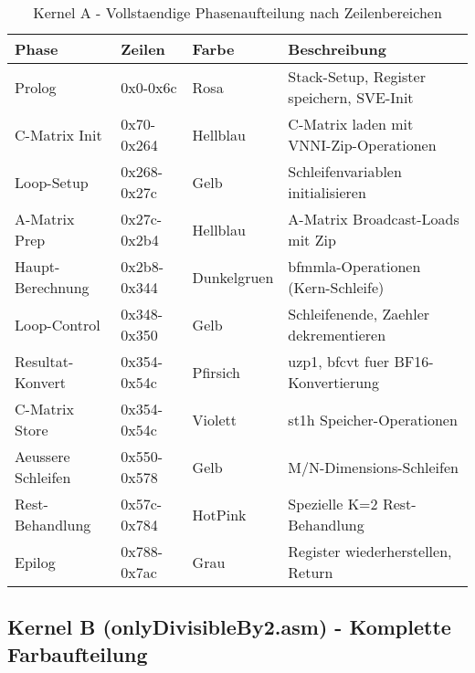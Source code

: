 \documentclass[11pt,a4paper]{article}
\begin{document}
\begin{table}[H]
\centering
\caption{Kernel A - Vollstaendige Phasenaufteilung nach Zeilenbereichen}
\footnotesize
\begin{tabular}{|l|l|l|p{6cm}|}
\hline
\textbf{Phase} & \textbf{Zeilen} & \textbf{Farbe} & \textbf{Beschreibung} \\
\hline
\rowcolor{prologue} Prolog & 0x0-0x6c & Rosa & Stack-Setup, Register speichern, SVE-Init \\
\rowcolor{matrixload} C-Matrix Init & 0x70-0x264 & Hellblau & C-Matrix laden mit VNNI-Zip-Operationen \\
\rowcolor{control} Loop-Setup & 0x268-0x27c & Gelb & Schleifenvariablen initialisieren \\
\rowcolor{matrixload} A-Matrix Prep & 0x27c-0x2b4 & Hellblau & A-Matrix Broadcast-Loads mit Zip \\
\rowcolor{vnnicomp} Haupt-Berechnung & 0x2b8-0x344 & Dunkelgruen & bfmmla-Operationen (Kern-Schleife) \\
\rowcolor{control} Loop-Control & 0x348-0x350 & Gelb & Schleifenende, Zaehler dekrementieren \\
\rowcolor{conversion} Resultat-Konvert & 0x354-0x54c & Pfirsich & uzp1, bfcvt fuer BF16-Konvertierung \\
\rowcolor{storage} C-Matrix Store & 0x354-0x54c & Violett & st1h Speicher-Operationen \\
\rowcolor{control} Aeussere Schleifen & 0x550-0x578 & Gelb & M/N-Dimensions-Schleifen \\
\rowcolor{remainder} Rest-Behandlung & 0x57c-0x784 & HotPink & Spezielle K=2 Rest-Behandlung \\
\rowcolor{epilogue} Epilog & 0x788-0x7ac & Grau & Register wiederherstellen, Return \\
\hline
\end{tabular}
\end{table}

\subsection{Kernel B (onlyDivisibleBy2.asm) - Komplette Farbaufteilung}
\end{document}
